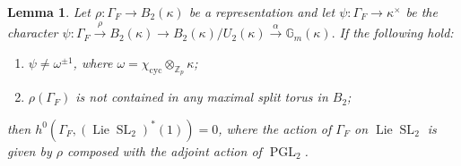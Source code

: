 \documentclass{amsart}
\newtheorem{lem}[prop]{Lemma}
\theoremstyle{definition}
\theoremstyle{remark}
\DeclareMathOperator{\SL}{SL}
\newcommand{\Zp}{\mathbb{Z}_p}
\newcommand{\Gm}{\mathbb G_{m}}
\DeclareMathOperator{\PGL}{PGL}
\newcommand{\cyc}{\mathrm{cyc}}
\DeclareMathOperator{\Lie}{Lie}
\begin{document}
\begin{lem}\label{BIP_Qtwo} Let $\rho: \Gamma_F \rightarrow B_2(\kappa)$ be a representation and let $\psi: \Gamma_F \rightarrow \kappa^{\times}$ be the character
$\psi: \Gamma_F \overset{\rho}{\longrightarrow} B_2(\kappa)\rightarrow B_2(\kappa)/U_2(\kappa) \overset{\alpha}{\longrightarrow} \Gm(\kappa).$
If the following hold:
\begin{enumerate}
\item $\psi \neq \omega^{\pm 1}$, where $\omega= \chi_{\cyc} \otimes_{\Zp} \kappa$;
\item $\rho(\Gamma_F)$ is not contained in any maximal split torus in $B_2$;
\end{enumerate}
then $h^0(\Gamma_F, (\Lie \SL_2)^*(1))=0$, where the action of $\Gamma_F$ on $\Lie \SL_2$ is
given by $\rho$ composed with the adjoint action of $\PGL_2$.
\end{lem}
\end{document}
